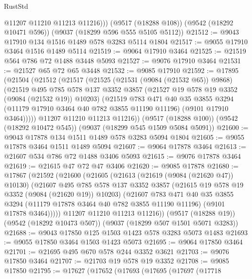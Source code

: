 \begin{lexlean}{RustStd}
\begin{coremodule}
          @11207
          @11210
          @11213
          @11216)))
    (@9517 (@18288 @108))
    (@9542 (@18292 @10471 @596))
    (@9037 (@18299 @596 @555 @5105 @5112))
@21512 := @9043 @17910 @134 @1516 @1489 @578 @3283 @5114 @1804
@21517 := @9055 @17910 @3464 @1516 @1489 @5114
@21519 := @9064 @17910 @3464
@21525 := @21519 @564 @786 @72 @1488 @3448 @5093
@21527 := @9076 @17910 @3464
@21531 := @21527 @65 @72 @65 @3448
@21532 := @9085 @17910
@21592 := @17895
    (@21504
      (@21512
        (@21517
          (@21525
            (@21531 (@9084 (@21532 @65)) @9868)
            (@21519
              @495
              @785
              @578
              @137
              @3352
              @3857
              (@21527 @19 @578 @19 @3352 (@9084 (@21532 @19)) @10203)
              (@21519
                @783
                @471
                @40
                @35
                @3855
                @3294
                (@11179 @17910 @3464 @40 @782 @3855 @11190 @11196)
                (@9101 @17910 @3464)))))
        @11207
        @11210
        @11213
        @11216))
    (@9517 (@18288 @100))
    (@9542 (@18292 @10472 @545))
    (@9037 (@18299 @545 @1509 @5084 @5091))
@21600 := @9043 @17878 @134 @1511 @1489 @578 @3283 @5094 @1804
@21605 := @9055 @17878 @3464 @1511 @1489 @5094
@21607 := @9064 @17878 @3464
@21613 := @21607 @534 @786 @72 @1488 @3406 @5093
@21615 := @9076 @17878 @3464
@21619 := @21615 @47 @72 @47 @3406
@21620 := @9085 @17878
@21680 := @17867
    (@21592
      (@21600
        (@21605
          (@21613
            (@21619 (@9084 (@21620 @47)) @10130)
            (@21607
              @495
              @785
              @578
              @137
              @3352
              @3857
              (@21615 @19 @578 @19 @3352 (@9084 (@21620 @19)) @10203)
              (@21607
                @783
                @471
                @40
                @35
                @3855
                @3294
                (@11179 @17878 @3464 @40 @782 @3855 @11190 @11196)
                (@9101 @17878 @3464)))))
        @11207
        @11210
        @11213
        @11216))
    (@9517 (@18288 @19))
    (@9542 (@18292 @10473 @507))
    (@9037 (@18299 @507 @1501 @5071 @3283))
@21688 := @9043 @17850 @125 @1503 @1423 @578 @3283 @5073 @1483
@21693 := @9055 @17850 @3464 @1503 @1423 @5073
@21695 := @9064 @17850 @3464
@21701 := @21695 @495 @670 @578 @244 @3352 @3621
@21703 := @9076 @17850 @3464
@21707 := @21703 @19 @578 @19 @3352
@21708 := @9085 @17850
@21795 := @17627
    (@17652
      (@17693
        (@17695
          (@17697
            (@17718

\end{coremodule}
\end{lexlean}
